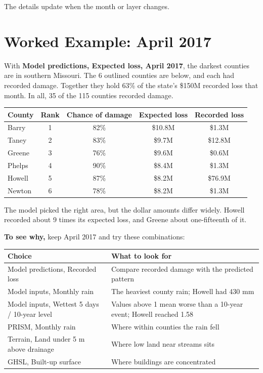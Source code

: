 \documentclass[11pt]{article}
\begin{document}
The details update when the month or layer changes.

\section{Worked Example: April 2017}

With \textbf{Model predictions, Expected loss, April 2017}, the darkest counties are in southern
Missouri. The 6 outlined counties are below, and each had recorded damage. Together they hold
63\% of the state's \$150M recorded loss that month. In all, 35 of the 115 counties recorded damage.

\begin{table}[H]
\centering
\small
\begin{tabular}{lcccc}
\toprule
\textbf{County} & \textbf{Rank} & \textbf{Chance of damage} & \textbf{Expected loss} & \textbf{Recorded loss} \\
\midrule
Barry & 1 & 82\% & \$10.8M & \$1.3M \\
Taney & 2 & 83\% & \$9.7M & \$12.8M \\
Greene & 3 & 76\% & \$9.6M & \$0.6M \\
Phelps & 4 & 90\% & \$8.4M & \$1.3M \\
Howell & 5 & 87\% & \$8.2M & \$76.9M \\
Newton & 6 & 78\% & \$8.2M & \$1.3M \\
\bottomrule
\end{tabular}
\end{table}

\noindent The model picked the right area, but the dollar amounts differ widely. Howell recorded
about 9 times its expected loss, and Greene about one-fifteenth of it.

\textbf{To see why,} keep April 2017 and try these combinations:

\begin{table}[H]
\centering
\small
\begin{tabularx}{\textwidth}{lY}
\toprule
\textbf{Choice} & \textbf{What to look for} \\
\midrule
Model predictions, Recorded loss & Compare recorded damage with the predicted pattern \\
Model inputs, Monthly rain & The heaviest county rain; Howell had 430 mm \\
Model inputs, Wettest 5 days / 10-year level & Values above 1 mean worse than a 10-year event; Howell reached 1.58 \\
PRISM, Monthly rain & Where within counties the rain fell \\
Terrain, Land under 5 m above drainage & Where low land near streams sits \\
GHSL, Built-up surface & Where buildings are concentrated \\
\bottomrule
\end{tabularx}
\end{table}
\end{document}
